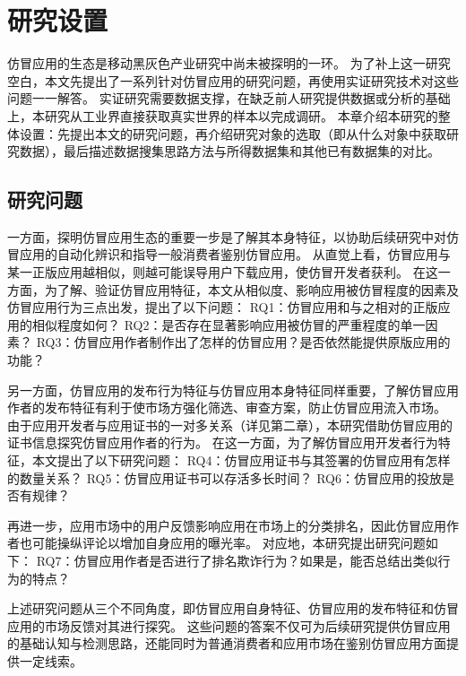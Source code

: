 \chapter{研究设置}
\label{chp:data_description}

仿冒应用的生态是移动黑灰色产业研究中尚未被探明的一环。
为了补上这一研究空白，本文先提出了一系列针对仿冒应用的研究问题，再使用实证研究技术对这些问题一一解答。
实证研究需要数据支撑，在缺乏前人研究提供数据或分析的基础上，本研究从工业界直接获取真实世界的样本以完成调研。
本章介绍本研究的整体设置：先提出本文的研究问题，再介绍研究对象的选取（即从什么对象中获取研究数据），最后描述数据搜集思路方法与所得数据集和其他已有数据集的对比。


\section{研究问题}

一方面，探明仿冒应用生态的重要一步是了解其本身特征，以协助后续研究中对仿冒应用的自动化辨识和指导一般消费者鉴别仿冒应用。
从直觉上看，仿冒应用与某一正版应用越相似，则越可能误导用户下载应用，使仿冒开发者获利。
在这一方面，为了解、验证仿冒应用特征，本文从相似度、影响应用被仿冒程度的因素及仿冒应用行为三点出发，提出了以下问题：
RQ1：仿冒应用和与之相对的正版应用的相似程度如何？
RQ2：是否存在显著影响应用被仿冒的严重程度的单一因素？
RQ3：仿冒应用作者制作出了怎样的仿冒应用？是否依然能提供原版应用的功能？

另一方面，仿冒应用的发布行为特征与仿冒应用本身特征同样重要，了解仿冒应用作者的发布特征有利于使市场方强化筛选、审查方案，防止仿冒应用流入市场。
由于应用开发者与应用证书的一对多关系（详见第二章），本研究借助仿冒应用的证书信息探究仿冒应用作者的行为。
在这一方面，为了解仿冒应用开发者行为特征，本文提出了以下研究问题：
RQ4：仿冒应用证书与其签署的仿冒应用有怎样的数量关系？
RQ5：仿冒应用证书可以存活多长时间？
RQ6：仿冒应用的投放是否有规律？

再进一步，应用市场中的用户反馈影响应用在市场上的分类排名，因此仿冒应用作者也可能操纵评论以增加自身应用的曝光率。
对应地，本研究提出研究问题如下：
RQ7：仿冒应用作者是否进行了排名欺诈行为？如果是，能否总结出类似行为的特点？

上述研究问题从三个不同角度，即仿冒应用自身特征、仿冒应用的发布特征和仿冒应用的市场反馈对其进行探究。
这些问题的答案不仅可为后续研究提供仿冒应用的基础认知与检测思路，还能同时为普通消费者和应用市场在鉴别仿冒应用方面提供一定线索。

